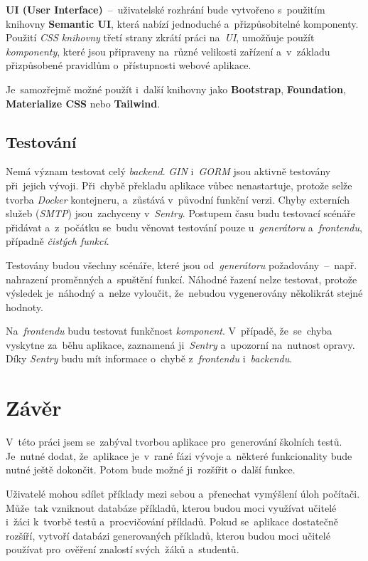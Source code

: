 \documentclass[11pt,a4paper]{report}
\begin{document}
            \textbf{UI (User Interface)}~--~uživatelské rozhrání bude vytvořeno s~použitím knihovny \textbf{Semantic UI}, která nabízí jednoduché a~přizpůsobitelné komponenty. Použití \emph{CSS knihovny} třetí strany zkrátí práci na~\emph{UI}, umožňuje použít \emph{komponenty}, které jsou připraveny na~různé velikosti zařízení a~v~základu přizpůsobené pravidlům o~přístupnosti webové aplikace.

            Je~samozřejmě možné použít i~další knihovny jako \textbf{Bootstrap}, \textbf{Foundation}, \textbf{Materialize CSS} nebo \textbf{Tailwind}.

        \section{Testování}
            Nemá význam testovat celý \emph{backend}. \emph{GIN} i~\emph{GORM} jsou aktivně testovány při~jejich vývoji. Při~chybě překladu aplikace vůbec nenastartuje, protože selže tvorba \emph{Docker} kontejneru, a~zůstává v~původní funkční verzi. Chyby externích služeb (\emph{SMTP}) jsou~zachyceny v~\emph{Sentry}. Postupem času budu testovací scénáře přidávat a~z~počátku se~budu věnovat testování pouze u~\emph{generátoru} a~\emph{frontendu}, případně \emph{čistých funkcí}.

            Testovány budou všechny scénáře, které jsou od~\emph{generátoru} požadovány~--~např. nahrazení proměnných a~spuštění funkcí. Náhodné řazení nelze testovat, protože výsledek je~náhodný a~nelze vyloučit, že~nebudou vygenerovány několikrát stejné hodnoty.

            Na~\emph{frontendu} budu testovat funkčnost \emph{komponent}. V~případě, že~se~chyba vyskytne za~běhu aplikace, zaznamená ji~\emph{Sentry} a~upozorní na~nutnost opravy. Díky \emph{Sentry} budu mít informace o~chybě z~\emph{frontendu} i~\emph{backendu}.
        
            
    \chapter{Závěr}
        V~této práci jsem se~zabýval tvorbou aplikace pro~generování školních testů. Je~nutné dodat, že~aplikace je~v~rané fázi vývoje a~některé funkcionality bude nutné ještě dokončit. Potom bude možné ji~rozšířit o~další funkce.
        
        Uživatelé mohou sdílet příklady mezi sebou a~přenechat vymýšlení úloh počítači. Může~tak vzniknout databáze příkladů, kterou budou moci využívat učitelé i~žáci k~tvorbě testů a~procvičování příkladů. Pokud se~aplikace dostatečně rozšíří, vytvoří databázi generovaných příkladů, kterou budou moci učitelé používat pro~ověření znalostí svých~žáků a~studentů.
        
\end{document}
